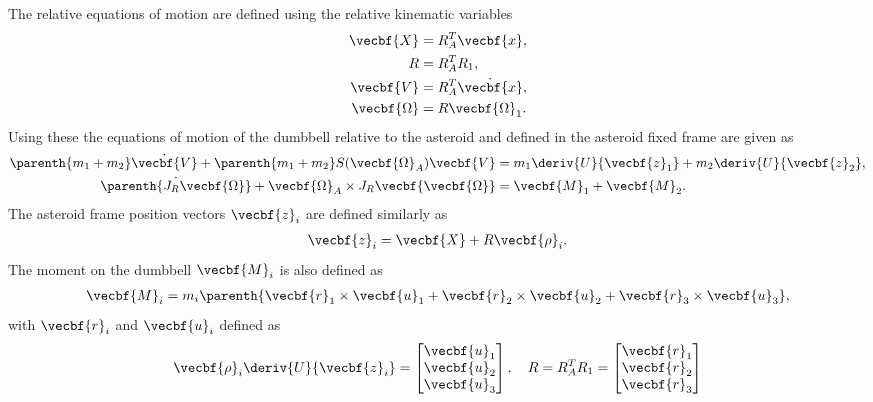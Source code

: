 \documentclass[11pt, reqno]{article}    %
\begin{document}
The relative equations of motion are defined using the relative kinematic variables
\begin{align}
    \vecbf{X} &= R_A^T \vecbf{x}, \\
    R &= R_A^T R_1 ,\\
    \vecbf{V} &= R_A^T \dot{\vecbf{x}} ,\\
    \vecbf{\Omega} &= R \vecbf{\Omega}_1.
\end{align}
Using these the equations of motion of the dumbbell relative to the asteroid and defined in the asteroid fixed frame are given as
\begin{align}
    \parenth{m_1 + m_2} \dot{\vecbf{V}} + \parenth{m_1 + m_2} S(\vecbf{\Omega}_A) \vecbf{V} &= m_1 \deriv{U}{\vecbf{z}_1} + m_2 \deriv{U}{\vecbf{z}_2} , \\
    \dot{\parenth{J_R \vecbf{\Omega}}} + \vecbf{\Omega}_A \times J_R \vecbf{\vecbf{\Omega}} &= \vecbf{M}_1 + \vecbf{M}_2 .
\end{align}
The asteroid frame position vectors \( \vecbf{z}_i \) are defined similarly as 
\begin{align*}
    \vecbf{z}_i = \vecbf{X} + R \vecbf{\rho}_i .
\end{align*}
The moment on the dumbbell \( \vecbf{M}_i \) is also defined as
\begin{align*}
    \vecbf{M}_i = m_i \parenth{ \vecbf{r}_1 \times \vecbf{u}_1 + \vecbf{r}_2 \times \vecbf{u}_2 + \vecbf{r}_3 \times \vecbf{u}_3},
\end{align*}
with \( \vecbf{r}_i \) and \( \vecbf{u}_i \) defined as
\begin{align*}
    \vecbf{\rho}_i \deriv{U}{\vecbf{z}_i} = \begin{bmatrix}\vecbf{u}_1 \\ \vecbf{u}_2 \\ \vecbf{u}_3 \end{bmatrix} ,
    \quad
    R = R_A^T R_1 = \begin{bmatrix}\vecbf{r}_1 \\\vecbf{r}_2 \\ \vecbf{r}_3 \end{bmatrix}
\end{align*}
\end{document}
